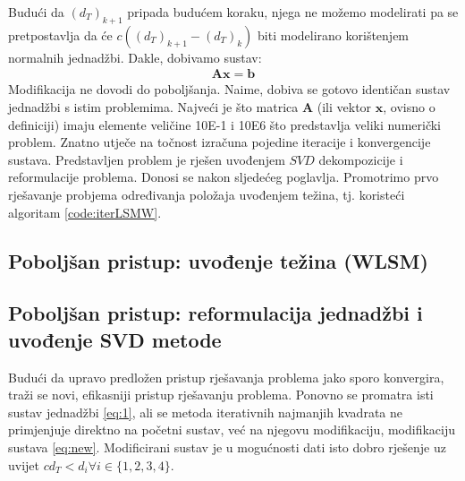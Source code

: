 \documentclass[a4paper,twoside,12pt]{memoir} %
\begin{document}
Budući da $(d_T)_{k+1}$ pripada budućem koraku, njega ne možemo modelirati pa se pretpostavlja da
će $c((d_T)_{k+1}-(d_T)_{k})$ biti modelirano korištenjem normalnih jednadžbi. Dakle, dobivamo sustav:
\begin{align}\label{eq:sustav2}
\mathbf{A}\mathbf{x} = \mathbf{b}
\end{align}
Modifikacija ne dovodi do poboljšanja. Naime, dobiva se gotovo identičan sustav jednadžbi s istim problemima.
Najveći je što matrica $\mathbf{A}$ (ili vektor $\mathbf{x}$, ovisno o definiciji) imaju elemente veličine 10E-1 i 
10E6 što predstavlja veliki numerički problem. Znatno utječe na točnost izračuna pojedine iteracije i konvergencije sustava.
Predstavljen problem je rješen uvođenjem $SVD$ dekompozicije i reformulacije problema.
Donosi se nakon sljedećeg poglavlja. Promotrimo prvo rješavanje probjema određivanja položaja uvođenjem težina, tj. 
koristeći algoritam \ref{code:iterLSMW}.

\subsection{Poboljšan pristup: uvođenje težina (WLSM)}%


\subsection{Poboljšan pristup: reformulacija jednadžbi i uvođenje SVD metode}
Budući da upravo predložen pristup rješavanja problema jako sporo konvergira, traži se
novi, efikasniji pristup rješavanju problema. Ponovno se promatra isti sustav jednadžbi \ref{eq:1}, ali se 
metoda iterativnih najmanjih kvadrata ne primjenjuje direktno na početni sustav, već na njegovu modifikaciju, modifikaciju sustava \ref{eq:new}.
Modificirani sustav je u mogućnosti dati isto dobro rješenje uz uvijet $cd_T < d_i \forall i \in \{1,2,3,4\}$. \\
\end{document}
